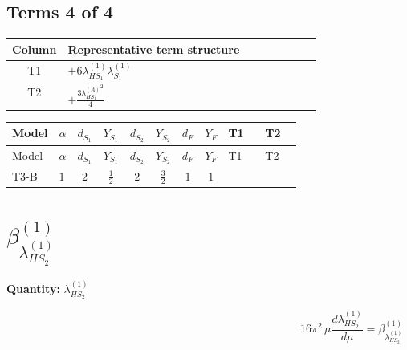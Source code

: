 \documentclass[8pt]{article}
\begin{document}
\begin{landscape}
\subsection*{Terms 4 of 4}
\begin{center}
\begin{tabular}{@{}c >{\raggedright\arraybackslash}p{0.82\linewidth}@{}}
\toprule
Column & Representative term structure \\
\midrule
T1 & \(\displaystyle +6 {\lambda_{HS_1}^{(1)}} {\lambda_{S_1}^{(1)}}\) \\
\midrule
T2 & \(\displaystyle +\frac{3 {\lambda_{HS_1}^{(A)}}^2}{4}\) \\
\midrule
\bottomrule
\end{tabular}
\end{center}
\smallskip
\tiny
\begin{longtable}{@{}llcccccc >{\raggedright\arraybackslash}p{0.21\linewidth} >{\raggedright\arraybackslash}p{0.21\linewidth}@{}}
\toprule
Model & $\alpha$ & $d_{S_1}$ & $Y_{S_1}$ & $d_{S_2}$ & $Y_{S_2}$ & $d_F$ & $Y_F$ & T1 & T2 \\
\midrule
\endfirsthead
\toprule
Model & $\alpha$ & $d_{S_1}$ & $Y_{S_1}$ & $d_{S_2}$ & $Y_{S_2}$ & $d_F$ & $Y_F$ & T1 & T2 \\
\midrule
\endhead
T3-B & $1$ & $2$ & $\frac{1}{2}$ & $2$ & $\frac{3}{2}$ & $1$ & $1$ & \scriptsize\adjustbox{max width=\linewidth}{$\begin{gathered} +6 {\lambda_{HS_1}^{(1)}} {\lambda_{S_1}^{(1)}}\end{gathered}$} & \scriptsize\adjustbox{max width=\linewidth}{$\begin{gathered} +\frac{3 {\lambda_{HS_1}^{(A)}}^2}{4}\end{gathered}$} \\
\midrule
\bottomrule
\end{longtable}
\clearpage
\section*{$\beta_{\lambda_{HS_2}^{(1)}}^{(1)}$}
\noindent\textbf{Quantity: }$\lambda_{HS_2}^{(1)}$\par\smallskip
\[16\pi^2\,\mu\frac{d \lambda_{HS_2}^{(1)}}{d\mu}=\beta_{\lambda_{HS_2}^{(1)}}^{(1)}\]

\end{landscape}
\end{document}
